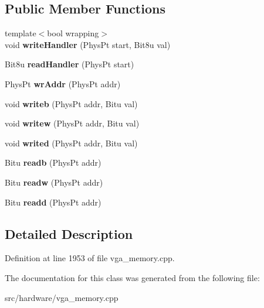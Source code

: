 \subsection*{Public Member Functions}
\begin{DoxyCompactItemize}
\item 
\hypertarget{classVGA__AMS__Handler_aeb0a1c400b9162e4e5e48bf0905d4865}{{\footnotesize template$<$bool wrapping$>$ }\\void {\bfseries write\-Handler} (Phys\-Pt start, Bit8u val)}\label{classVGA__AMS__Handler_aeb0a1c400b9162e4e5e48bf0905d4865}

\item 
\hypertarget{classVGA__AMS__Handler_a5661278164e2d7259ee9c8fe4c35d6df}{Bit8u {\bfseries read\-Handler} (Phys\-Pt start)}\label{classVGA__AMS__Handler_a5661278164e2d7259ee9c8fe4c35d6df}

\item 
\hypertarget{classVGA__AMS__Handler_a63b72ffd104220eb928c683bae72def3}{Phys\-Pt {\bfseries wr\-Addr} (Phys\-Pt addr)}\label{classVGA__AMS__Handler_a63b72ffd104220eb928c683bae72def3}

\item 
\hypertarget{classVGA__AMS__Handler_a59765d00055305e3d5d9cae3eda1a135}{void {\bfseries writeb} (Phys\-Pt addr, Bitu val)}\label{classVGA__AMS__Handler_a59765d00055305e3d5d9cae3eda1a135}

\item 
\hypertarget{classVGA__AMS__Handler_a2ca35cd2132c57ab9a6cd145ca686efd}{void {\bfseries writew} (Phys\-Pt addr, Bitu val)}\label{classVGA__AMS__Handler_a2ca35cd2132c57ab9a6cd145ca686efd}

\item 
\hypertarget{classVGA__AMS__Handler_a3a628a09de5d72345c7b602f162de07b}{void {\bfseries writed} (Phys\-Pt addr, Bitu val)}\label{classVGA__AMS__Handler_a3a628a09de5d72345c7b602f162de07b}

\item 
\hypertarget{classVGA__AMS__Handler_aa0a91b3133a6f53ab71af097705e5576}{Bitu {\bfseries readb} (Phys\-Pt addr)}\label{classVGA__AMS__Handler_aa0a91b3133a6f53ab71af097705e5576}

\item 
\hypertarget{classVGA__AMS__Handler_a91ae2471698b76066cff1f58dac6708c}{Bitu {\bfseries readw} (Phys\-Pt addr)}\label{classVGA__AMS__Handler_a91ae2471698b76066cff1f58dac6708c}

\item 
\hypertarget{classVGA__AMS__Handler_a98c3e7090b6a26e69c4afc84dc092415}{Bitu {\bfseries readd} (Phys\-Pt addr)}\label{classVGA__AMS__Handler_a98c3e7090b6a26e69c4afc84dc092415}

\end{DoxyCompactItemize}


\subsection{Detailed Description}


Definition at line 1953 of file vga\-\_\-memory.\-cpp.



The documentation for this class was generated from the following file\-:\begin{DoxyCompactItemize}
\item 
src/hardware/vga\-\_\-memory.\-cpp\end{DoxyCompactItemize}
